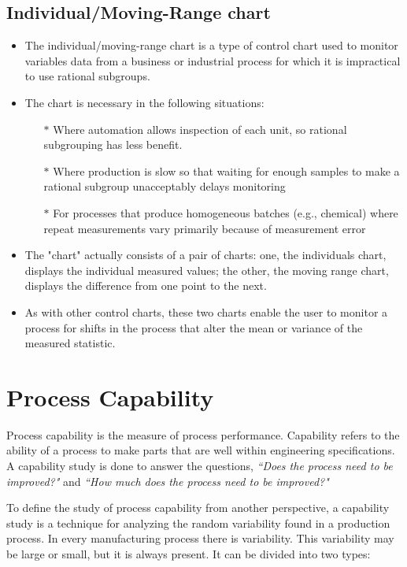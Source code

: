 \documentclass[]{article}
\begin{document}
\subsection{Individual/Moving-Range chart}
\begin{itemize}
\item The individual/moving-range chart is a type of control chart used to monitor variables data from a business or industrial process for which it is impractical to use rational subgroups.

\item The chart is necessary in the following situations:
\begin{itemize}
\item[$\ast$] Where automation allows inspection of each unit, so rational subgrouping has less benefit.
\item[$\ast$]Where production is slow so that waiting for enough samples to make a rational subgroup unacceptably delays monitoring
\item[$\ast$] For processes that produce homogeneous batches (e.g., chemical) where repeat measurements vary primarily because of measurement error
\end{itemize}
\item The "chart" actually consists of a pair of charts: one, the individuals chart, displays the individual measured values; the other, the moving range chart, displays the difference from one point to the next. 
\item As with other control charts, these two charts enable the user to monitor a process for shifts in the process that alter the mean or variance of the measured statistic.
\end{itemize}
\newpage
\section{Process Capability}
Process capability is the measure of process performance. Capability refers to the ability of a process to make parts that are well within engineering specifications. A capability study is done to answer the questions, \textit{``Does the process need to be improved?"} and  \textit{``How much does the process need to be improved?"}

To define the study of process capability from another perspective, a capability study is a technique for analyzing the random variability found in a production process. In every manufacturing process there is variability. This variability may be large or small, but it is always present. It can be divided into two types:
\end{document}
